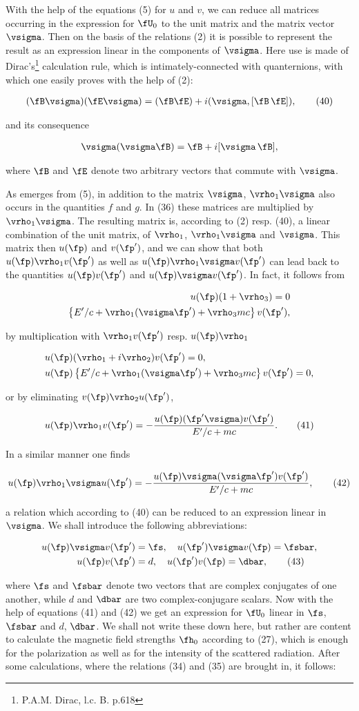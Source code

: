\documentclass{article}
\newcommand{\nequ}[2]{
\begin{align*}
#1
\tag{#2}
\end{align*}
}
\newcommand{\uequ}[1]{
\begin{align*}
#1
\end{align*}
}
\begin{document}
With the help of the equations (5) for $u$ and $v$, we can reduce all matrices occurring in the expression for $\fU_0$ to the unit matrix and the matrix vector $\vsigma$. Then on the basis of the relations (2) it is possible to represent the result as an expression linear in the components of $\vsigma$. Here use is made of Dirac's\footnote{P.A.M. Dirac, l.c. B. p.618} calculation rule, which is intimately-connected with quanternions, with which one easily proves with the help of (2):
\nequ{
(\fB \vsigma)(\fE \vsigma) = (\fB\fE) + i(\vsigma, [\fB\,\fE]),
}{40}
and its consequence
\uequ{
\vsigma(\vsigma \fB) = \fB + i[\vsigma\,\fB],
}
where $\fB$ and $\fE$ denote two arbitrary vectors that commute with $\vsigma$.

As emerges from (5), in addition to the matrix $\vsigma$, $\vrho_1\vsigma$ also occurs in the quantities $f$ and $g$. In (36) these matrices are multiplied by $\vrho_1 \vsigma$. The resulting matrix is, according to (2) resp. (40), a linear combination of the unit matrix, of $\vrho_1$, $\vrho_1 \vsigma$ and $\vsigma$. This matrix then  $u(\fp)$ and $v(\fp')$, and we can show that both $u(\fp)\vrho_1 v(\fp')$ as well as $u(\fp)\vrho_1 \vsigma v(\fp')$ can lead back to the quantities $u(\fp)v(\fp')$ and $u(\fp)\vsigma v(\fp')$. In fact, it follows from
\uequ{
u(\fp)(1+\vrho_3) =0\\
\left\{E'/c + \vrho_1(\vsigma \fp') + \vrho_3 mc \right\}v(\fp'),
}
by multiplication with $\vrho_1 v(\fp')$ resp. $u(\fp)\vrho_1$
\uequ{
&u(\fp)(\vrho_1 + i\vrho_2)v(\fp') = 0,\\
&u(\fp)\left\{E'/c + \vrho_1(\vsigma \fp') + \vrho_3 mc \right\}v(\fp') = 0,
}
or by eliminating $v(\fp)\vrho_2 u(\fp')$,
\nequ{
u(\fp)\vrho_1 v(\fp') = -\frac{u(\fp)(\fp' \vsigma)v(\fp')}{E'/c + mc}.
}{41}
In a similar manner one finds
\nequ{
u(\fp)\vrho_1 \vsigma u(\fp') = -\frac{u(\fp)\vsigma(\vsigma \fp')v(\fp')}{E'/c + mc},
}{42}
a relation which according to (40) can be reduced to an expression linear in $\vsigma$. We shall introduce the following abbreviations:
\nequ{
u(\fp)\vsigma v(\fp') &= \fs,\quad u(\fp')\vsigma v(\fp) = \fsbar,\\
u(\fp) v(\fp') &= d,\quad u(\fp') v(\fp) = \dbar,
}{43}
where $\fs$ and $\fsbar$ denote two vectors that are complex conjugates of one another, while $d$ and $\dbar$ are two complex-conjugare scalars. Now with the help of equations (41) and (42) we get an expression for $\fU_0$ linear in $\fs$, $\fsbar$ and $d$, $\dbar$.  We shall not write these down here, but rather are content to calculate the magnetic field strengths $\fh_0$ according to (27), which is enough for the polarization as well as for the intensity of the scattered radiation. After some calculations, where the relations (34) and (35) are brought in, it follows:
\end{document}
